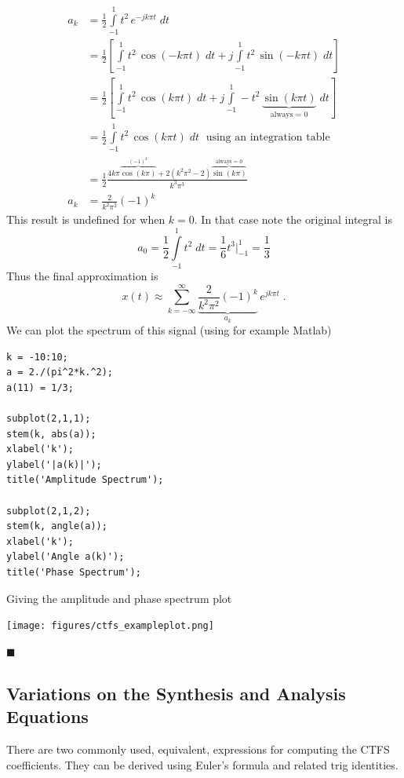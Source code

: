 \begin{example}
\begin{align*}
  a_k &= \frac{1}{2} \int\limits_{-1}^{1} t^2\,e^{-jk\pi t} \; dt\\
  &= \frac{1}{2} \left[ \int\limits_{-1}^{1} t^2\,\cos(-k\pi t) \; dt + j \int\limits_{-1}^{1} t^2\,\sin(-k\pi t) \; dt \right]\\
  &= \frac{1}{2} \left[ \int\limits_{-1}^{1} t^2\,\cos(k\pi t) \; dt + j \int\limits_{-1}^{1} - t^2\,\underbrace{\sin(k\pi t)}_{\text{always = 0}} \; dt \right]\\
  &= \frac{1}{2} \int\limits_{-1}^{1} t^2\,\cos(k\pi t) \; dt\; \mbox{ using an integration table }\\
  &= \frac{1}{2} \frac{4k\pi\overbrace{\cos(k\pi)}^{(-1)^k} + 2(k^2\pi^2-2)\overbrace{\sin(k\pi)}^{\text{always = 0}}}{k^3\pi^3}\\
 a_k &= \frac{2}{k^2\pi^2}\left(-1\right)^k
\end{align*}
This result is undefined for when $k=0$. In that case note the original integral is
\[
a_0 = \frac{1}{2} \int\limits_{-1}^{1} t^2 \; dt = \frac{1}{6}t^3 \Big|_{-1}^{1} = \frac{1}{3} 
\]
Thus the final approximation is
\[
x(t) \approx \sum\limits_{k = -\infty}^{\infty} \underbrace{\frac{2}{k^2\pi^2}\left(-1\right)^k}_{a_k} \, e^{j k\pi t} \;.
\]
We can plot the spectrum of this signal (using for example Matlab)
\begin{verbatim}
k = -10:10;
a = 2./(pi^2*k.^2);
a(11) = 1/3;

subplot(2,1,1);
stem(k, abs(a));
xlabel('k');
ylabel('|a(k)|');
title('Amplitude Spectrum');

subplot(2,1,2);
stem(k, angle(a));
xlabel('k');
ylabel('Angle a(k)');
title('Phase Spectrum');
\end{verbatim}
Giving the amplitude and phase spectrum plot
\begin{center}
\texttt{[image: figures/ctfs\_exampleplot.png]}
\end{center}
$\blacksquare$
\end{example}

\subsection{Variations on the Synthesis and Analysis Equations}
There are two commonly used, equivalent, expressions for computing the CTFS coefficients. They can be derived using Euler's formula and related trig identities.


